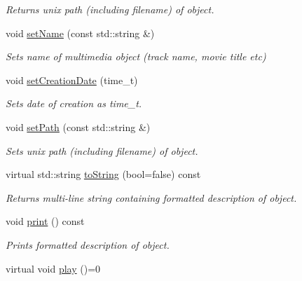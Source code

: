 \begin{DoxyCompactItemize}
\begin{DoxyCompactList}\small\item\em Returns unix path (including filename) of object. \end{DoxyCompactList}\item 
\hypertarget{classBaseObject_a7d8dca471d4e0eb15620f518f48d2a8c}{void \hyperlink{classBaseObject_a7d8dca471d4e0eb15620f518f48d2a8c}{set\+Name} (const std\+::string \&)}\label{classBaseObject_a7d8dca471d4e0eb15620f518f48d2a8c}

\begin{DoxyCompactList}\small\item\em Sets name of multimedia object (track name, movie title etc) \end{DoxyCompactList}\item 
\hypertarget{classBaseObject_aeeb327051d61bd727722f583fa0bc41c}{void \hyperlink{classBaseObject_aeeb327051d61bd727722f583fa0bc41c}{set\+Creation\+Date} (time\+\_\+t)}\label{classBaseObject_aeeb327051d61bd727722f583fa0bc41c}

\begin{DoxyCompactList}\small\item\em Sets date of creation as time\+\_\+t. \end{DoxyCompactList}\item 
\hypertarget{classBaseObject_a7841749de25678d8cbedf021e760cbee}{void \hyperlink{classBaseObject_a7841749de25678d8cbedf021e760cbee}{set\+Path} (const std\+::string \&)}\label{classBaseObject_a7841749de25678d8cbedf021e760cbee}

\begin{DoxyCompactList}\small\item\em Sets unix path (including filename) of object. \end{DoxyCompactList}\item 
\hypertarget{classBaseObject_af433968d291ebfc54c701987047f9348}{virtual std\+::string \hyperlink{classBaseObject_af433968d291ebfc54c701987047f9348}{to\+String} (bool=false) const }\label{classBaseObject_af433968d291ebfc54c701987047f9348}

\begin{DoxyCompactList}\small\item\em Returns multi-\/line string containing formatted description of object. \end{DoxyCompactList}\item 
void \hyperlink{classBaseObject_a9bad65dddde7dec1ea622edce664cc9f}{print} () const 
\begin{DoxyCompactList}\small\item\em Prints formatted description of object. \end{DoxyCompactList}\item 
\hypertarget{classBaseObject_a63e43537301807233867a3b61052f5a6}{virtual void \hyperlink{classBaseObject_a63e43537301807233867a3b61052f5a6}{play} ()=0}\label{classBaseObject_a63e43537301807233867a3b61052f5a6}


\end{DoxyCompactItemize}
